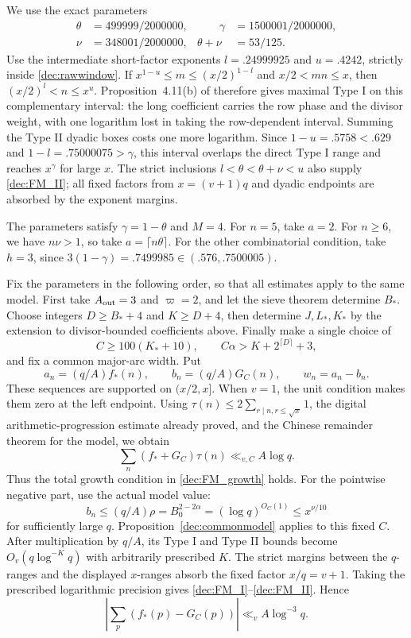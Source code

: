 \documentclass[11pt,a4paper]{article}
\theoremstyle{paperplain}
\numberwithin{equation}{section}
\begin{document}
We use the exact parameters
\begin{equation}\label{dec:FMparameters}
 \begin{aligned}
 \theta&=499999/2000000,&\qquad \gamma&=1500001/2000000,\\
 \nu&=348001/2000000,& \theta+\nu&=53/125.
 \end{aligned}
\end{equation}
Use the intermediate short-factor exponents $l=.24999925$ and
$u=.4242$, strictly inside \eqref{dec:rawwindow}. If
$x^{1-u}\le m\le(x/2)^{1-l}$ and $x/2<mn\le x$, then
$(x/2)^l<n\le x^u$. Proposition~4.11(b) of \cite{FordMaynard2024}
therefore gives maximal Type I on this complementary interval: the long
coefficient carries the row phase and the divisor weight, with one
logarithm lost in taking the row-dependent interval. Summing the Type II
dyadic boxes costs one more logarithm. Since $1-u=.5758<.629$ and
$1-l=.75000075>\gamma$, this interval overlaps the direct Type I range
and reaches $x^\gamma$ for large $x$. The strict inclusions
$l<\theta<\theta+\nu<u$ also supply \eqref{dec:FM_II}; all fixed factors
from $x=(v+1)q$ and dyadic endpoints are absorbed by the exponent margins.

The parameters satisfy $\gamma=1-\theta$ and $M=4$.
For $n=5$, take $a=2$.
For $n\ge6$, we have $n\nu>1$, so take $a=\lceil n\theta\rceil$.
For the other combinatorial condition, take $h=3$, since
$3(1-\gamma)=.7499985\in(.576,.7500005)$.

Fix the parameters in the following order, so that all estimates
apply to the same model.
First take $A_{\rm out}=3$ and $\varpi=2$, and let the sieve theorem
determine $B_*$. Choose integers $D\ge B_*+4$ and $K\ge D+4$,
then determine $J,L_*,K_*$ by the extension to divisor-bounded
coefficients above. Finally make a single choice of
\[
 C\ge100(K_*+10),\qquad C\alpha>K+2^{\lceil D\rceil}+3,
\]
and fix a common major-arc width. Put
\[
 a_n=(q/A)f_*(n),\qquad b_n=(q/A)G_C(n),\qquad w_n=a_n-b_n.
\]
These sequences are supported on $(x/2,x]$.
When $v=1$, the unit condition makes them zero at the left endpoint.
Using $\tau(n)\le2\sum_{r\mid n,r\le\sqrt x}1$, the digital
arithmetic-progression estimate already proved, and the Chinese
remainder theorem for the model, we obtain
\[
 \sum_n(f_*+G_C)\tau(n)\ll_{v,C}A\log q.
\]
Thus the total growth condition in \eqref{dec:FM_growth} holds.
For the pointwise negative part, use the actual model value:
\[
 b_n\le(q/A)\rho=B_0^{2-2\alpha}=(\log q)^{O_C(1)}\le x^{\nu/10}
\]
for sufficiently large $q$.
Proposition~\ref{dec:commonmodel} applies to this fixed $C$.
After multiplication by $q/A$, its Type I and Type II bounds become
$O_v(q\log^{-K}q)$ with arbitrarily prescribed $K$.
The strict margins between the $q$-ranges and the displayed $x$-ranges
absorb the fixed factor $x/q=v+1$.
Taking the prescribed logarithmic precision gives
\eqref{dec:FM_I}--\eqref{dec:FM_II}. Hence
\begin{equation}\label{dec:primecomparison}
 \left|\sum_p(f_*(p)-G_C(p))\right|\ll_vA\log^{-3}q.
\end{equation}
\end{document}
